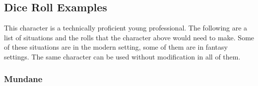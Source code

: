 \documentclass{LegrandOrangeTufteBook}
\begin{document}




\subsection*{Dice Roll Examples}

This character is a technically proficient young professional.
The following are a list of situations and the rolls that the character above would need to make.
Some of these situations are in the modern setting, some of them are in fantasy settings. The same character can be used without modification in all of them.

\subsubsection*{Mundane}
\end{document}
